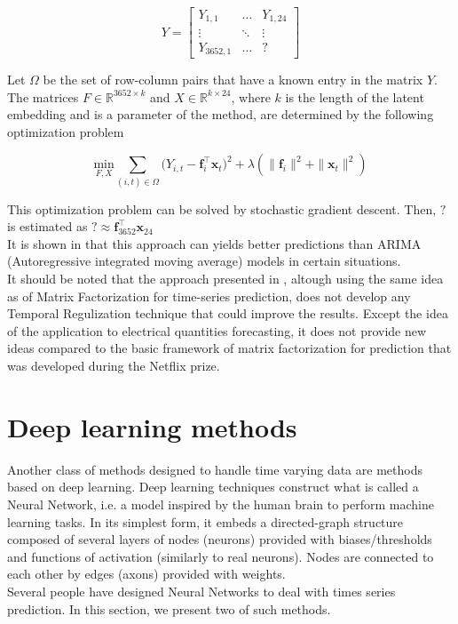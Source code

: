 \documentclass{article}
\begin{document}
$$Y = \begin{bmatrix} Y_{1,1} & \hdots & Y_{1,24} \\ \vdots & \ddots & \vdots \\ Y_{3652,1} & \hdots & ? \end{bmatrix}$$

Let $\Omega$ be the set of row-column pairs that have a known entry in the matrix $Y$. The matrices $F \in \mathbb{R}^{3652 \times k}$ and $X \in \mathbb{R}^{k \times 24}$, where $k$ is the length of the latent embedding and is a parameter of the method, are determined by the following optimization problem

$$\underset{F,X}{\text{min}} \sum_{(i,t) \in \Omega} \Big( Y_{i,t} - \mathbf{f}_i^{\top}\mathbf{x}_t \Big)^2 + \lambda (\|\mathbf{f}_i\|^2 + \|\mathbf{x}_t\|^2) $$

This optimization problem can be solved by stochastic gradient descent. Then, $?$ is estimated as $? \approx \mathbf{f}_{3652}^{\top}\mathbf{x}_{24}$ \\
It is shown in \cite{Elec} that this approach can yields better predictions than ARIMA (Autoregressive integrated moving average) models in certain situations. \\

It should be noted that the approach presented in \cite{Elec}, altough using the same idea as \cite{TRMF} of Matrix Factorization for time-series prediction, does not develop any Temporal Regulization technique that could improve the results. Except the idea of the application to electrical quantities forecasting, it does not provide new ideas compared to the basic framework of matrix factorization for prediction that was developed during the Netflix prize.

\section{Deep learning methods}
\label{dl}
Another class of methods designed to handle time varying data are methods based on deep learning.
Deep learning techniques construct what is called a Neural Network, i.e. a model inspired by the human brain to perform machine learning tasks. In its simplest form, it embeds a directed-graph structure composed of several layers of nodes (neurons) provided with biases/thresholds and functions of activation (similarly to real neurons). Nodes are connected to each other by edges (axons) provided with weights. \\
Several people have designed Neural Networks to deal with times series prediction. In this section, we present two of such methods.
\end{document}
